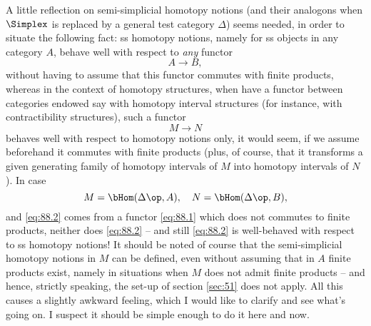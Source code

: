 \enspace A little reflection on semi-simplicial
homotopy notions (and their analogons when $\Simplex$ is replaced by a
general test category $\Delta$) seems needed, in order to situate the
following fact: ss homotopy notions, namely for ss objects in any
category $A$, behave well with respect to \emph{any} functor
\begin{equation}
  \label{eq:88.1}
  A\to B,\tag{1}
\end{equation}
without having to assume that this functor commutes with finite
products, whereas in the context of homotopy structures, when have a
functor between categories endowed say with homotopy interval
structures (for instance, with contractibility structures), such a
functor
\begin{equation}
  \label{eq:88.2}
  M\to N\tag{2}
\end{equation}
behaves well with respect to homotopy notions only, it would seem, if
we assume beforehand it commutes with finite products (plus, of
course, that it transforms a given generating family of homotopy
intervals of $M$ into homotopy intervals of $N$). In
case
\[ M = \bHom(\Delta\op,A), \quad N=\bHom(\Delta\op,B),\]
and \eqref{eq:88.2} comes from a functor \eqref{eq:88.1} which does
not commutes to finite products, neither does \eqref{eq:88.2} -- and
still \eqref{eq:88.2} is well-behaved with respect to ss homotopy
notions! It should be noted of course that the semi-simplicial
homotopy notions in $M$ can be defined, even without assuming that in
$A$ finite products exist, namely in situations when $M$ does not
admit finite products -- and hence, strictly speaking, the set-up of
section \ref{sec:51} does not apply. All this causes a slightly
awkward feeling, which I would like to clarify and see what's going
on. I suspect it should be simple enough to do it here and now.

